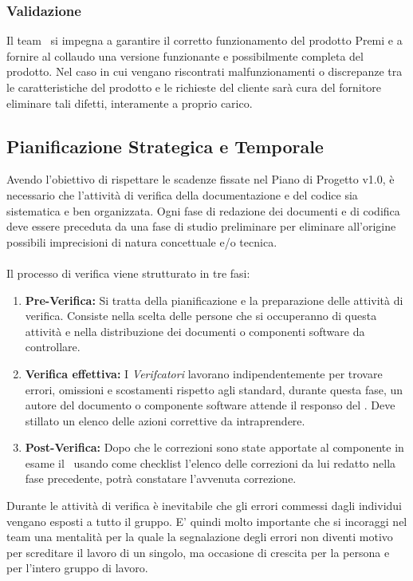 \subsubsection{Validazione}
Il team \gruppo\ si impegna a garantire il corretto funzionamento del prodotto Premi e a fornire al collaudo una versione funzionante e possibilmente completa del prodotto. Nel caso in cui vengano riscontrati malfunzionamenti o discrepanze tra le caratteristiche del prodotto e le richieste del cliente sarà cura del fornitore eliminare tali difetti, interamente a proprio carico.

\subsection{Pianificazione Strategica e Temporale}
Avendo l'obiettivo di rispettare le scadenze fissate nel Piano di Progetto v1.0, è necessario che l'attività di verifica della documentazione e del codice sia sistematica e ben organizzata. Ogni fase di redazione dei documenti e di codifica deve essere preceduta da una fase di studio preliminare per eliminare all'origine possibili imprecisioni di natura concettuale e/o tecnica.
\\ \\Il processo di verifica viene strutturato in tre fasi:
\begin{enumerate}
	\item \textbf{Pre-Verifica:} Si tratta della pianificazione e la preparazione delle attività di verifica. Consiste nella scelta delle persone che si occuperanno di questa attività e nella distribuzione dei documenti o componenti software da controllare.
    \item \textbf{Verifica effettiva:} I \textit{Verifcatori} lavorano indipendentemente per trovare errori, omissioni e scostamenti rispetto agli standard, durante questa fase, un autore del documento o componente software attende il responso del \ruoloVerificatore. Deve stillato un elenco delle azioni correttive da intraprendere.
    \item \textbf{Post-Verifica:} Dopo che le correzioni sono state apportate al componente in esame il \ruoloVerificatore\, usando  come checklist l'elenco delle correzioni da lui redatto nella fase precedente, potrà constatare l'avvenuta correzione.
\end{enumerate}
Durante le attività di verifica è inevitabile che gli errori commessi dagli individui vengano esposti a tutto il gruppo. E' quindi molto importante che si incoraggi nel team una mentalità per la quale la segnalazione degli errori non diventi motivo per screditare il lavoro di un singolo, ma occasione di crescita per la persona e per l'intero gruppo di lavoro.

